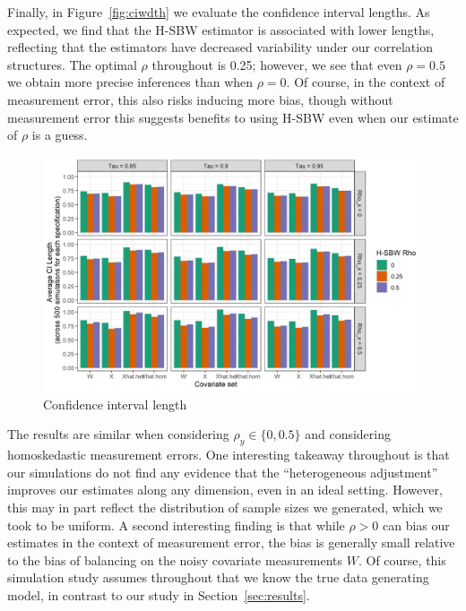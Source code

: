 Finally, in Figure~\ref{fig:ciwdth} we evaluate the confidence interval lengths. As expected, we find that the H-SBW estimator is associated with lower lengths, reflecting that the estimators have decreased variability under our correlation structures. The optimal $\rho$ throughout is 0.25; however, we see that even $\rho = 0.5$ we obtain more precise inferences than when $\rho = 0$. Of course, in the context of measurement error, this also risks inducing more bias, though without measurement error this suggests benefits to using H-SBW even when our estimate of $\rho$ is a guess.

\begin{figure}[H]\label{fig:ciwidth}
\begin{center}
    \caption{Confidence interval length}\label{fig:simcoverage2}
    \includegraphics[scale=0.5]{01_Plots/ci-length-plot.png}
\end{center}
\end{figure}

The results are similar when considering $\rho_y \in \{0, 0.5\}$ and considering homoskedastic measurement errors. One interesting takeaway throughout is that our simulations do not find any evidence that the ``heterogeneous adjustment'' improves our estimates along any dimension, even in an ideal setting. However, this may in part reflect the distribution of sample sizes we generated, which we took to be uniform. A second interesting finding is that while $\rho > 0$ can bias our estimates in the context of measurement error, the bias is generally small relative to the bias of balancing on the noisy covariate measurements $W$. Of course, this simulation study assumes throughout that we know the true data generating model, in contrast to our study in Section~\ref{sec:results}.